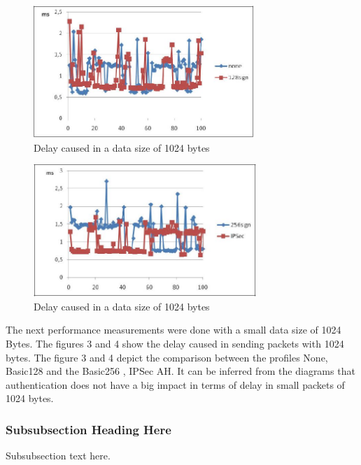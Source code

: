 \documentclass[conference]{IEEEtran}
\begin{document}
\begin{figure}[ht]
\centering
\includegraphics[height=50mm]{Figures/security_fig3}\quad
\caption[Subfigure example]{\label{f:security_fig3}Delay caused in a data size of 1024 bytes}
\end{figure}

\begin{figure}[ht]
\centering
\includegraphics[height=50mm]{Figures/security_fig4}\quad
\caption[Subfigure example]{\label{f:security_fig4}Delay caused in a data size of 1024 bytes}
\end{figure}

The next performance measurements were done with a small data size of 1024 Bytes. The figures 3 and 4 show the delay caused in sending packets with 1024 bytes. The figure 3 and 4 depict the comparison between the profiles None, Basic128 and the Basic256 , IPSec AH. It can be inferred from the diagrams that authentication does not have a big impact in terms of delay in small packets of 1024 bytes.	 	 


\subsubsection{Subsubsection Heading Here}
Subsubsection text here.
\end{document}
